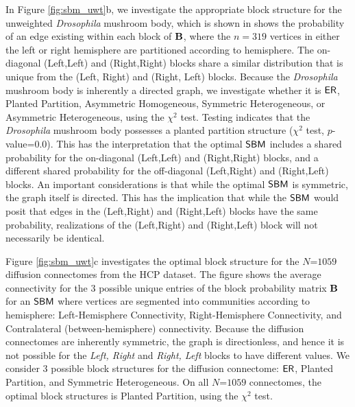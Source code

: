 In Figure \ref{fig:sbm_uwt}b, we investigate the appropriate block structure for the unweighted \textit{Drosophila} mushroom body, which is shown in  shows the probability of an edge existing within each block of $\operatorname{\mathbf{B}}$, where the $n=319$ vertices in either the left or right hemisphere are partitioned according to hemisphere. 
The on-diagonal (Left,Left) and (Right,Right) blocks share a similar distribution that is unique from the (Left, Right) and (Right, Left) blocks. Because the \textit{Drosophila} mushroom body is inherently a directed graph, we investigate whether it is $\operatorname{\mathsf{ER}}$, Planted Partition, Asymmetric Homogeneous, Symmetric Heterogeneous, or Asymmetric Heterogeneous, using the $\chi^2$ test. Testing indicates that the \textit{Drosophila} mushroom body possesses a planted partition structure ($\chi^2$ test, $p$-value=$0.0$). 
This has the interpretation that the optimal $\operatorname{\mathsf{SBM}}$ includes a shared probability for the on-diagonal (Left,Left) and (Right,Right) blocks, and a different shared probability for the off-diagonal (Left,Right) and (Right,Left) blocks. An important considerations is that while the optimal $\operatorname{\mathsf{SBM}}$ is symmetric, the graph itself is directed. This has the implication that while the $\operatorname{\mathsf{SBM}}$ would posit that edges in the (Left,Right) and (Right,Left) blocks have the same probability, realizations of the (Left,Right) and (Right,Left) block will not necessarily be identical. 

Figure \ref{fig:sbm_uwt}c investigates the optimal block structure for the $N$=$1059$ diffusion connectomes from the HCP dataset. The figure shows the average connectivity for the $3$ possible unique entries of the block probability matrix $\operatorname{\mathbf{B}}$ for an $\operatorname{\mathsf{SBM}}$ where vertices are segmented into communities according to hemisphere: Left-Hemisphere Connectivity, Right-Hemisphere Connectivity, and Contralateral (between-hemisphere) connectivity. Because the diffusion connectomes are inherently symmetric, the graph is directionless, and hence it is not possible for the \textit{Left, Right} and \textit{Right, Left} blocks to have different values. We consider $3$ possible block structures for the diffusion connectome: $\operatorname{\mathsf{ER}}$, Planted Partition, and Symmetric Heterogeneous. On all $N$=$1059$ connectomes, the optimal block structures is Planted Partition, using the $\chi^2$ test.

